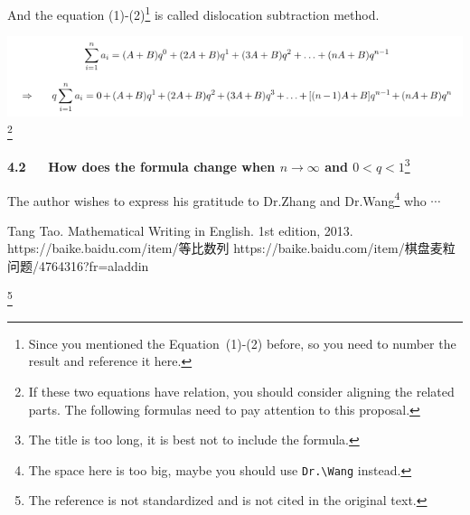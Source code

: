 \begin{original}
    And the equation (1)-(2)\footnote{Since you mentioned the Equation~(1)-(2) before, so you need to number the result and reference it here.} is called dislocation subtraction method.
\end{original}

\begin{original}
    \includegraphics[width=\textwidth]{figures/geometric_progression-2}\footnote{If these two equations have relation, you should consider aligning the related parts. The following formulas need to pay attention to this proposal.}
\end{original}

\begin{original}
    \textbf{4.2 $\quad$ How does the formula change when $n\to\infty$ and $0<q<1$}\footnote{The title is too long, it is best not to include the formula.}
\end{original}

\begin{original}
    The author wishes to express his gratitude to Dr.\phantom{X}Zhang and Dr.\phantom{X}Wang\footnote{The space here is too big, maybe you should use \texttt{Dr.\backslash Wang} instead.} who $\cdots$
\end{original}

\begin{original}
    \begin{thebibliography}{9}
         Tang Tao. Mathematical Writing in English. 1st edition, 2013.
         https://baike.baidu.com/item/等比数列
         https://baike.baidu.com/item/棋盘麦粒问题/4764316?fr=aladdin
    \end{thebibliography}\footnote{The reference is not standardized and is not cited in the original text.}
\end{original}
